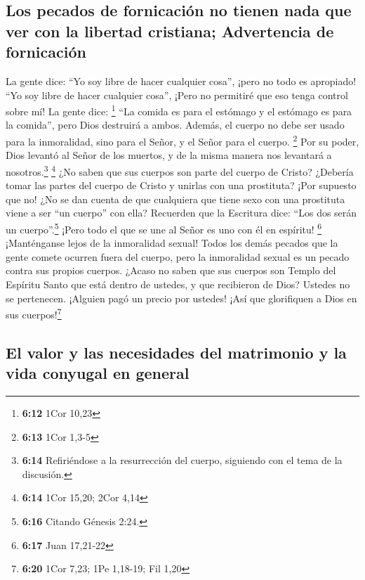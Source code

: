 \hypertarget{los-pecados-de-fornicaciuxf3n-no-tienen-nada-que-ver-con-la-libertad-cristiana-advertencia-de-fornicaciuxf3n}{%
\subsection{Los pecados de fornicación no tienen nada que ver con la
libertad cristiana; Advertencia de
fornicación}\label{los-pecados-de-fornicaciuxf3n-no-tienen-nada-que-ver-con-la-libertad-cristiana-advertencia-de-fornicaciuxf3n}}

 La gente dice: ``Yo soy libre de hacer cualquier cosa'',
¡pero no todo es apropiado! ``Yo soy libre de hacer cualquier cosa'',
¡Pero no permitiré que eso tenga control sobre mí! La gente dice:
\footnote{\textbf{6:12} 1Cor 10,23}  ``La comida es para
el estómago y el estómago es para la comida'', pero Dios destruirá a
ambos. Además, el cuerpo no debe ser usado para la inmoralidad, sino
para el Señor, y el Señor para el cuerpo. \footnote{\textbf{6:13} 1Cor
  1,3-5}  Por su poder, Dios levantó al Señor de los
muertos, y de la misma manera nos levantará a nosotros.\footnote{\textbf{6:14}
  Refiriéndose a la resurrección del cuerpo, siguiendo con el tema de la
  discusión.} \footnote{\textbf{6:14} 1Cor 15,20; 2Cor 4,14}
 ¿No saben que sus cuerpos son parte del cuerpo de
Cristo? ¿Debería tomar las partes del cuerpo de Cristo y unirlas con una
prostituta? ¡Por supuesto que no!  ¿No se dan cuenta de
que cualquiera que tiene sexo con una prostituta viene a ser ``un
cuerpo'' con ella? Recuerden que la Escritura dice: ``Los dos serán un
cuerpo''.\footnote{\textbf{6:16} Citando Génesis 2:24.} 
¡Pero todo el que se une al Señor es uno con él en espíritu! \footnote{\textbf{6:17}
  Juan 17,21-22}  ¡Manténganse lejos de la inmoralidad
sexual! Todos los demás pecados que la gente comete ocurren fuera del
cuerpo, pero la inmoralidad sexual es un pecado contra sus propios
cuerpos.  ¿Acaso no saben que sus cuerpos son Templo del
Espíritu Santo que está dentro de ustedes, y que recibieron de Dios?
 Ustedes no se pertenecen. ¡Alguien pagó un precio por
ustedes! ¡Así que glorifiquen a Dios en sus cuerpos!\footnote{\textbf{6:20}
  1Cor 7,23; 1Pe 1,18-19; Fil 1,20}

\hypertarget{el-valor-y-las-necesidades-del-matrimonio-y-la-vida-conyugal-en-general}{%
\subsection{El valor y las necesidades del matrimonio y la vida conyugal
en
general}\label{el-valor-y-las-necesidades-del-matrimonio-y-la-vida-conyugal-en-general}}

